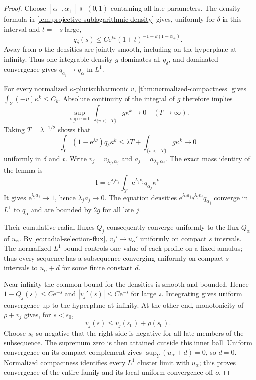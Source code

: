 \begin{proof}
Choose $[\alpha_-,\alpha_+]\Subset(0,1)$ containing all late parameters. The density formula in \cref{lem:projective-sublogarithmic-density} gives, uniformly for $\delta$ in this interval and $t=-s$ large,
\[
 q_\delta(s)\leq C\mathrm e^{kt}(1+t)^{-1-k(1-\alpha_+)}.
\]
Away from $o$ the densities are jointly smooth, including on the hyperplane at infinity. Thus one integrable density $g$ dominates all $q_\delta$, and dominated convergence gives $q_{\alpha_j}\to q_\alpha$ in $L^1$.

For every normalized $\kappa$-plurisubharmonic $v$, \cref{thm:normalized-compactness} gives $\int_Y(-v)\kappa^k\leq C_k$. Absolute continuity of the integral of $g$ therefore implies
\[
 \sup_{\sup_Yv=0}\int_{\{v<-T\}}g\kappa^k\longrightarrow0
 \quad(T\to\infty).
\]
Taking $T=\lambda^{-1/2}$ shows that
\[
 \int_Y(1-\mathrm e^{\lambda v})q_\delta\kappa^k
 \leq\lambda T+\int_{\{v<-T\}}g\kappa^k\longrightarrow0
\]
uniformly in $\delta$ and $v$. Write $v_j=v_{\lambda_j,\alpha_j}$ and $a_j=a_{\lambda_j,\alpha_j}$. The exact mass identity of the lemma is
\begin{equation}\label{eq:radial-selection-mass}
 1=\mathrm e^{\lambda_ja_j}
          \int_Y\mathrm e^{\lambda_jv_j}q_{\alpha_j}\kappa^k.
\end{equation}
It gives $\mathrm e^{\lambda_ja_j}\to1$, hence $\lambda_ja_j\to0$. The equation densities $\mathrm e^{\lambda_ja_j}\mathrm e^{\lambda_jv_j}q_{\alpha_j}$ converge in $L^1$ to $q_\alpha$ and are bounded by $2g$ for all late $j$.

Their cumulative radial fluxes $Q_j$ consequently converge uniformly to the flux $Q_\alpha$ of $u_\alpha$. By \eqref{eq:radial-selection-flux}, $v_j'\to u_\alpha'$ uniformly on compact $s$ intervals. The normalized $L^1$ bound controls one value of each profile on a fixed annulus; thus every sequence has a subsequence converging uniformly on compact $s$ intervals to $u_\alpha+d$ for some finite constant $d$.

Near infinity the common bound for the densities is smooth and bounded. Hence $1-Q_j(s)\leq C\mathrm e^{-s}$ and $|v_j'(s)|\leq C\mathrm e^{-s}$ for large $s$. Integrating gives uniform convergence up to the hyperplane at infinity. At the other end, monotonicity of $\rho+v_j$ gives, for $s<s_0$,
\[
 v_j(s)\leq v_j(s_0)+\rho(s_0).
\]
Choose $s_0$ so negative that the right side is negative for all late members of the subsequence. The supremum zero is then attained outside this inner ball. Uniform convergence on its compact complement gives $\sup_Y(u_\alpha+d)=0$, so $d=0$. Normalized compactness identifies every $L^1$ cluster limit with $u_\alpha$; this proves convergence of the entire family and its local uniform convergence off $o$.


\end{proof}
